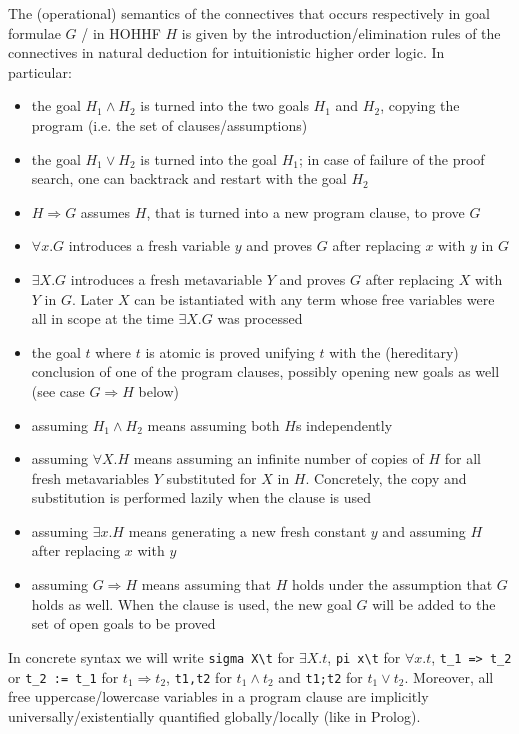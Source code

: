 \documentclass[preprint]{sigplanconf}
\begin{document}
The (operational) semantics of the connectives that occurs respectively in goal formulae $G$ / in HOHHF $H$ is given by the introduction/elimination rules of the connectives in natural deduction for intuitionistic higher order logic. In particular:
\begin{itemize}
\item the goal $H_1 \wedge H_2$ is turned into the two goals $H_1$ and $H_2$,
 copying the program (i.e. the set of clauses/assumptions)
\item the goal $H_1 \vee H_2$ is turned into the goal $H_1$; in case of failure of the proof search, one can backtrack and restart with the goal $H_2$
\item $H \Rightarrow G$ assumes $H$, that is turned into a new program clause, to prove $G$
\item $\forall x.G$ introduces a fresh variable $y$ and proves $G$ after replacing $x$ with $y$ in $G$
\item $\exists X.G$ introduces a fresh metavariable $Y$ and proves $G$ after replacing $X$ with $Y$ in $G$. Later $X$ can be istantiated with any term whose free variables were all in scope at the time $\exists X.G$ was processed
\item the goal $t$ where $t$ is atomic is proved unifying $t$ with the
(hereditary) conclusion of one of the program clauses, possibly opening new
goals as well (see case $G \Rightarrow H$ below)
\item assuming $H_1 \wedge H_2$ means assuming both $H$s independently
\item assuming $\forall X.H$ means assuming an infinite number of copies of $H$ for all fresh metavariables $Y$ substituted for $X$ in $H$. Concretely, the copy and substitution is performed lazily when the clause is used
\item assuming $\exists x.H$ means generating a new fresh constant $y$ and assuming $H$ after replacing $x$ with $y$
\item assuming $G \Rightarrow H$ means assuming that $H$ holds under the assumption that $G$ holds as well. When the clause is used, the new goal $G$ will be added to the set of open goals to be proved
\end{itemize}

In concrete syntax we will write \verb+sigma X\t+ for $\exists X.t$, \verb+pi x\t+ for $\forall x.t$, \verb+t_1 => t_2+ or \verb+t_2 := t_1+ for $t_1 \Rightarrow t_2$, \verb+t1,t2+ for $t_1 \wedge t_2$ and \verb+t1;t2+ for $t_1 \vee t_2$. Moreover, all free uppercase/lowercase variables in a program clause are implicitly universally/existentially quantified globally/locally (like in Prolog).
\end{document}
